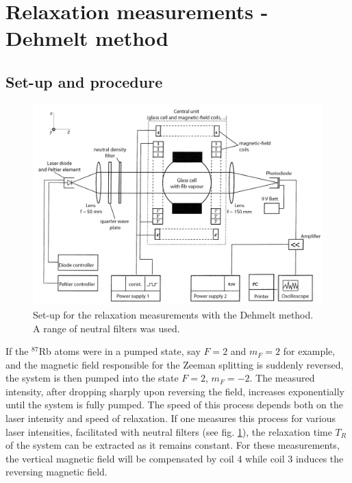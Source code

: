 \section{Relaxation measurements - Dehmelt method}
\subsection{Set-up and procedure}
\begin{figure}
\centering
\includegraphics[width=1.0\linewidth]{graphics/dehmeltsetup}
\caption[Set-up relaxation measurements - Dehmelt]{Set-up for the relaxation measurements with the Dehmelt method. A range of neutral filters was used. \cite{anleitung}}
\label{fig:dehmeltsetup}
\end{figure}
If the $^{87}$Rb atoms were in a pumped state, say $F=2$ and $m_F=2$ for example, and the magnetic field responsible for the Zeeman splitting is suddenly reversed, the system is then pumped into the state $F=2$, $m_F=-2$. The measured intensity, after dropping sharply upon reversing the field, increases exponentially until the system is fully pumped. The speed of this process depends both on the laser intensity and speed of relaxation. If one measures this process for various laser intensities, facilitated with neutral filters (see fig. \ref{fig:dehmeltsetup}), the relaxation time $T_R$ of the system can be extracted as it remains constant. For these measurements, the vertical magnetic field will be compensated by coil 4 while coil 3 induces the reversing magnetic field.

